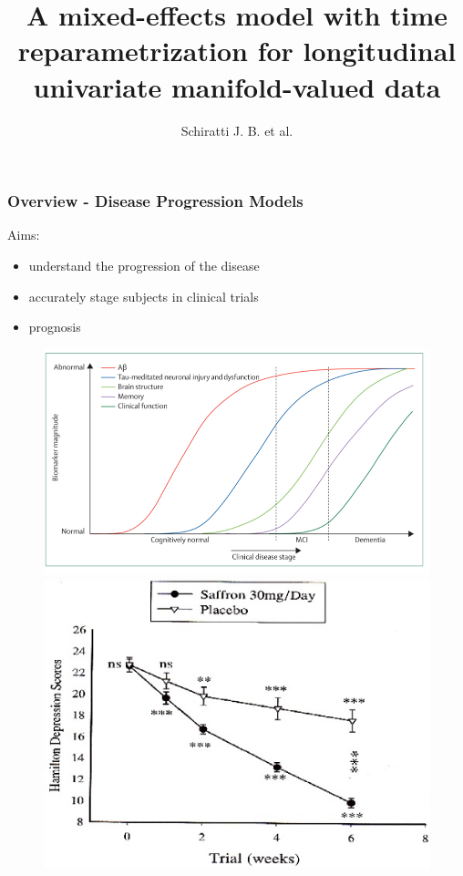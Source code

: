 \documentclass[10pt,xcolor=table]{beamer}
\title{A mixed-effects model with time reparametrization for longitudinal univariate manifold-valued data}
\author{Schiratti J. B. et al.}
\institute{IPMI 2015}
\begin{document}
 
\frame{\titlepage}
 


\begin{frame}
\frametitle{Overview - Disease Progression Models}

Aims: 
\begin{itemize}
  \item understand the progression of the disease
  \item accurately stage subjects in clinical trials
  \item prognosis
\end{itemize}

\begin{figure}
\includegraphics[scale=0.22]{jack_curves.png}
\includegraphics[scale=1.2]{drug_progression.jpg}
\end{figure}

\end{frame}
\end{document}
